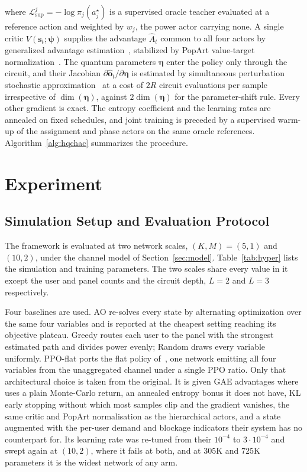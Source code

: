 \documentclass[12pt,onecolumn]{IEEEtran}
\begin{document}
where $\mathcal{L}^{j}_{\mathrm{sup}}=-\log\pi_j(a_j^{\star})$ is a supervised oracle
teacher evaluated at a reference action and weighted by $w_j$, the power actor carrying
none. A single critic $V(\mathbf{s}_t;\boldsymbol{\psi})$ supplies the advantage
$\hat{A}_t$ common to all four actors by generalized advantage
estimation~\cite{schulman2015high}, stabilized by PopArt value-target
normalization~\cite{vanhasselt2016popart}. The quantum parameters
$\boldsymbol{\eta}$ enter the policy only through the circuit, and their Jacobian
$\partial\hat{\mathbf{o}}_t/\partial\boldsymbol{\eta}$ is estimated by simultaneous
perturbation stochastic approximation~\cite{spall1992multivariate} at a cost of $2R$
circuit evaluations per sample irrespective of $\dim(\boldsymbol{\eta})$, against
$2\dim(\boldsymbol{\eta})$ for the parameter-shift rule. Every other gradient is exact.
The entropy coefficient and the learning rates are annealed on fixed schedules, and joint
training is preceded by a supervised warm-up of the assignment and phase actors on the
same oracle references. Algorithm~\ref{alg:hqchac} summarizes the procedure.
\fi

\FloatBarrier
\section{Experiment}
\label{sec:results}

\subsection{Simulation Setup and Evaluation Protocol}
\label{sec:setup}

The framework is evaluated at two network scales, $(K,M)=(5,1)$ and $(10,2)$, under the
channel model of Section~\ref{sec:model}. Table~\ref{tab:hyper} lists the simulation and
training parameters. The two scales share every value in it except the user and panel
counts and the circuit depth, $L=2$ and $L=3$ respectively.

Four baselines are used. AO re-solves every state by alternating optimization over the same
four variables and is reported at the cheapest setting reaching its objective plateau.
Greedy routes each user to the panel with the strongest estimated path and divides power
evenly; Random draws every variable uniformly. PPO-flat ports the flat policy
of~\cite{meng2023sum}, one network emitting all four variables from the unaggregated
channel under a single PPO ratio. Only that architectural choice is taken from the
original. It is given GAE advantages where~\cite{meng2023sum} uses a plain
Monte-Carlo return, an annealed entropy bonus it does not have, KL early stopping
without which most samples clip and the gradient vanishes, the same critic and PopArt
normalisation as the hierarchical actors, and a state augmented with the per-user
demand and blockage indicators their system has no counterpart for. Its learning rate
was re-tuned from their $10^{-4}$ to $3{\cdot}10^{-4}$ and swept again at $(10,2)$,
where it fails at both, and at $305$K and $725$K parameters it is the widest network
of any arm.
\end{document}
